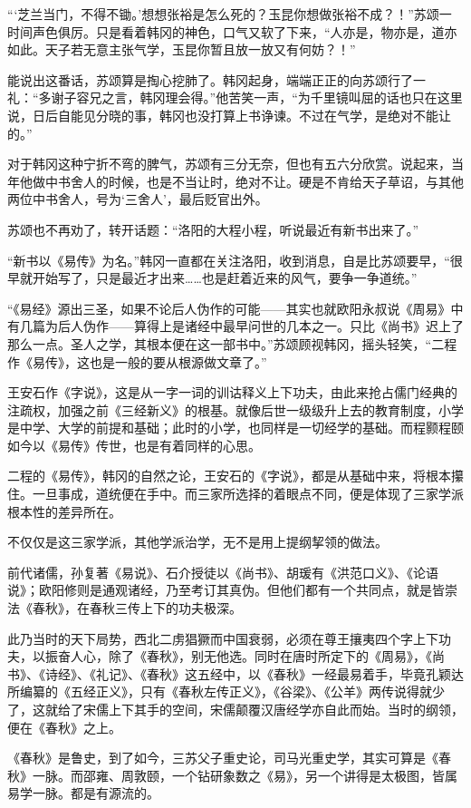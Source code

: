“‘芝兰当门，不得不锄。’想想张裕是怎么死的？玉昆你想做张裕不成？！”苏颂一时间声色俱厉。只是看着韩冈的神色，口气又软了下来，“人亦是，物亦是，道亦如此。天子若无意主张气学，玉昆你暂且放一放又有何妨？！”

能说出这番话，苏颂算是掏心挖肺了。韩冈起身，端端正正的向苏颂行了一礼：“多谢子容兄之言，韩冈理会得。”他苦笑一声，“为千里镜叫屈的话也只在这里说，日后自能见分晓的事，韩冈也没打算上书诤谏。不过在气学，是绝对不能让的。”

对于韩冈这种宁折不弯的脾气，苏颂有三分无奈，但也有五六分欣赏。说起来，当年他做中书舍人的时候，也是不当让时，绝对不让。硬是不肯给天子草诏，与其他两位中书舍人，号为‘三舍人’，最后贬官出外。

苏颂也不再劝了，转开话题：“洛阳的大程小程，听说最近有新书出来了。”

“新书以《易传》为名。”韩冈一直都在关注洛阳，收到消息，自是比苏颂要早，“很早就开始写了，只是最近才出来……也是赶着近来的风气，要争一争道统。”

“《易经》源出三圣，如果不论后人伪作的可能——其实也就欧阳永叔说《周易》中有几篇为后人伪作——算得上是诸经中最早问世的几本之一。只比《尚书》迟上了那么一点。圣人之学，其根本便在这一部书中。”苏颂顾视韩冈，摇头轻笑，“二程作《易传》，这也是一般的要从根源做文章了。”

王安石作《字说》，这是从一字一词的训诂释义上下功夫，由此来抢占儒门经典的注疏权，加强之前《三经新义》的根基。就像后世一级级升上去的教育制度，小学是中学、大学的前提和基础；此时的小学，也同样是一切经学的基础。而程颢程颐如今以《易传》传世，也是有着同样的心思。

二程的《易传》，韩冈的自然之论，王安石的《字说》，都是从基础中来，将根本攥住。一旦事成，道统便在手中。而三家所选择的着眼点不同，便是体现了三家学派根本性的差异所在。

不仅仅是这三家学派，其他学派治学，无不是用上提纲挈领的做法。

前代诸儒，孙复著《易说》、石介授徒以《尚书》、胡瑗有《洪范口义》、《论语说》；欧阳修则是通观诸经，乃至考订其真伪。但他们都有一个共同点，就是皆崇法《春秋》，在春秋三传上下的功夫极深。

此乃当时的天下局势，西北二虏猖獗而中国衰弱，必须在尊王攘夷四个字上下功夫，以振奋人心，除了《春秋》，别无他选。同时在唐时所定下的《周易》，《尚书》、《诗经》、《礼记》、《春秋》这五经中，以《春秋》一经最易着手，毕竟孔颖达所编纂的《五经正义》，只有《春秋左传正义》，《谷梁》、《公羊》两传说得就少了，这就给了宋儒上下其手的空间，宋儒颠覆汉唐经学亦自此而始。当时的纲领，便在《春秋》之上。

《春秋》是鲁史，到了如今，三苏父子重史论，司马光重史学，其实可算是《春秋》一脉。而邵雍、周敦颐，一个钻研象数之《易》，另一个讲得是太极图，皆属易学一脉。都是有源流的。


